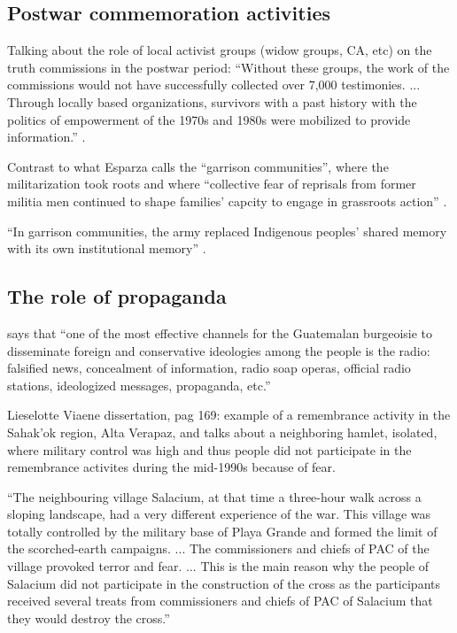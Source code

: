 \documentclass[12pt, notitlepage]{article}
\begin{document}
\subsection*{Postwar commemoration activities}

Talking about the role of local activist groups (widow groups, CA, etc) on the truth commissions in the postwar period: ``Without these groups, the work of the commissions would not have successfully collected over 7,000 testimonies. ... Through locally based organizations, survivors with a past history with the politics of empowerment of the 1970s and 1980s were mobilized to provide information.'' \citep[123]{Esparza:2018uw}.

Contrast to what Esparza calls the ``garrison communities'', where the militarization took roots and where ``collective fear of reprisals from former militia men continued to shape families' capcity to engage in grassroots action'' \citep[178]{Esparza:2018uw}.

``In garrison communities, the army replaced Indigenous peoples' shared memory with its own institutional memory'' \citep[192]{Esparza:2018uw}.

\subsection*{The role of propaganda}

\citet[16]{Bran:1985tc} says that ``one of the most effective channels for the Guatemalan burgeoisie to disseminate foreign and conservative ideologies among the people is the radio: falsified news, concealment of information, radio soap operas, official radio stations, ideologized messages, propaganda, etc.''

Lieselotte Viaene dissertation, pag 169: example of a remembrance activity in the Sahak'ok region, Alta Verapaz, and talks about a neighboring hamlet, isolated, where military control was high and thus people did not participate in the remembrance activites during the mid-1990s because of fear.

``The neighbouring village Salacium, at that time a three-hour walk across a sloping landscape, had a very different experience of the war. This village was totally controlled by the military base of Playa Grande and formed the limit of the scorched-earth campaigns. ... The commissioners and chiefs of PAC of the village provoked terror and fear. ... This is the main reason why the people of Salacium did not participate in the construction of the cross as the participants received several treats from commissioners and chiefs of PAC of Salacium that they would destroy the cross.'' \citep[169]{Viaene:2011td}
\end{document}
